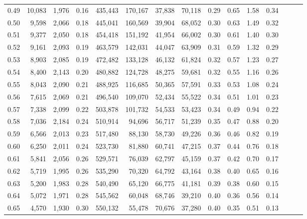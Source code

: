 \begin{tabular}{rrrrrrrrrrrrrrr}
0.49 &  10,083 &  1,976 &  0.16 &  435,443 &  170,167 &   37,838 &   70,118 &  0.29 &  0.65 &  1.58 &      0.34 \\
0.50 &   9,598 &  2,066 &  0.18 &  445,041 &  160,569 &   39,904 &   68,052 &  0.30 &  0.63 &  1.49 &      0.32 \\
0.51 &   9,377 &  2,050 &  0.18 &  454,418 &  151,192 &   41,954 &   66,002 &  0.30 &  0.61 &  1.40 &      0.30 \\
0.52 &   9,161 &  2,093 &  0.19 &  463,579 &  142,031 &   44,047 &   63,909 &  0.31 &  0.59 &  1.32 &      0.29 \\
0.53 &   8,903 &  2,085 &  0.19 &  472,482 &  133,128 &   46,132 &   61,824 &  0.32 &  0.57 &  1.23 &      0.27 \\
0.54 &   8,400 &  2,143 &  0.20 &  480,882 &  124,728 &   48,275 &   59,681 &  0.32 &  0.55 &  1.16 &      0.26 \\
0.55 &   8,043 &  2,090 &  0.21 &  488,925 &  116,685 &   50,365 &   57,591 &  0.33 &  0.53 &  1.08 &      0.24 \\
0.56 &   7,615 &  2,069 &  0.21 &  496,540 &  109,070 &   52,434 &   55,522 &  0.34 &  0.51 &  1.01 &      0.23 \\
0.57 &   7,338 &  2,099 &  0.22 &  503,878 &  101,732 &   54,533 &   53,423 &  0.34 &  0.49 &  0.94 &      0.22 \\
0.58 &   7,036 &  2,184 &  0.24 &  510,914 &   94,696 &   56,717 &   51,239 &  0.35 &  0.47 &  0.88 &      0.20 \\
0.59 &   6,566 &  2,013 &  0.23 &  517,480 &   88,130 &   58,730 &   49,226 &  0.36 &  0.46 &  0.82 &      0.19 \\
0.60 &   6,250 &  2,011 &  0.24 &  523,730 &   81,880 &   60,741 &   47,215 &  0.37 &  0.44 &  0.76 &      0.18 \\
0.61 &   5,841 &  2,056 &  0.26 &  529,571 &   76,039 &   62,797 &   45,159 &  0.37 &  0.42 &  0.70 &      0.17 \\
0.62 &   5,719 &  1,995 &  0.26 &  535,290 &   70,320 &   64,792 &   43,164 &  0.38 &  0.40 &  0.65 &      0.16 \\
0.63 &   5,200 &  1,983 &  0.28 &  540,490 &   65,120 &   66,775 &   41,181 &  0.39 &  0.38 &  0.60 &      0.15 \\
0.64 &   5,072 &  1,971 &  0.28 &  545,562 &   60,048 &   68,746 &   39,210 &  0.40 &  0.36 &  0.56 &      0.14 \\
0.65 &   4,570 &  1,930 &  0.30 &  550,132 &   55,478 &   70,676 &   37,280 &  0.40 &  0.35 &  0.51 &      0.13 \\

\end{tabular}
